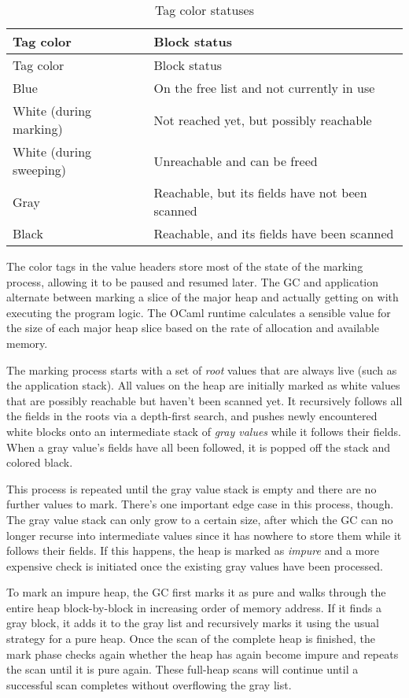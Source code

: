 \begin{longtable}[]{@{}ll@{}}
\caption{Tag color statuses}\tabularnewline
\toprule
Tag color & Block status\tabularnewline
\midrule
\endfirsthead
\toprule
Tag color & Block status\tabularnewline
\midrule
\endhead
Blue & On the free list and not currently in use\tabularnewline
White (during marking) & Not reached yet, but possibly
reachable\tabularnewline
White (during sweeping) & Unreachable and can be freed\tabularnewline
Gray & Reachable, but its fields have not been scanned\tabularnewline
Black & Reachable, and its fields have been scanned\tabularnewline
\bottomrule
\end{longtable}

The color tags in the value headers store most of the state of the
marking process, allowing it to be paused and resumed later. The GC and
application alternate between marking a slice of the major heap and
actually getting on with executing the program logic. The OCaml runtime
calculates a sensible value for the size of each major heap slice based
on the rate of allocation and available memory.

The marking process starts with a set of \emph{root} values that are
always live (such as the application stack). All values on the heap are
initially marked as white values that are possibly reachable but haven't
been scanned yet. It recursively follows all the fields in the roots via
a depth-first search, and pushes newly encountered white blocks onto an
intermediate stack of \emph{gray values} while it follows their fields.
When a gray value's fields have all been followed, it is popped off the
stack and colored black. 

This process is repeated until the gray value stack is empty and there
are no further values to mark. There's one important edge case in this
process, though. The gray value stack can only grow to a certain size,
after which the GC can no longer recurse into intermediate values since
it has nowhere to store them while it follows their fields. If this
happens, the heap is marked as \emph{impure} and a more expensive check
is initiated once the existing gray values have been processed.

To mark an impure heap, the GC first marks it as pure and walks through
the entire heap block-by-block in increasing order of memory address. If
it finds a gray block, it adds it to the gray list and recursively marks
it using the usual strategy for a pure heap. Once the scan of the
complete heap is finished, the mark phase checks again whether the heap
has again become impure and repeats the scan until it is pure again.
These full-heap scans will continue until a successful scan completes
without overflowing the gray list.

